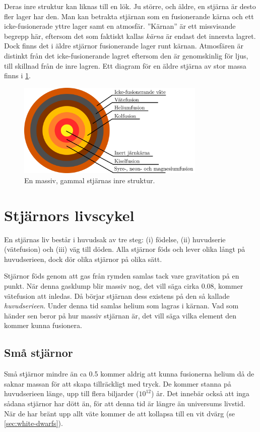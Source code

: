 Deras inre struktur kan liknas till en lök. Ju större, och äldre, en stjärna är desto fler lager har den. Man kan betrakta stjärnan som en fusionerande kärna och ett icke-fusionerade yttre lager samt en atmosfär. ''Kärnan'' är ett missvisande begrepp här, eftersom det som faktiskt kallas \emph{kärna} är endast det innersta lagret. Dock finns det i äldre stjärnor fusionerande lager runt kärnan. Atmosfären är distinkt från det icke-fusionerande lagret eftersom den är genomskinlig för ljus, till skillnad från de inre lagren. Ett diagram för en äldre stjärna av stor massa finns i \cref{fig:star-anatomy}.
\begin{figure}[h!]
    \centering
    \includegraphics[width=0.8\textwidth]{img/star.png}
    \caption{En massiv, gammal stjärnas inre struktur.}
    \label{fig:star-anatomy}
\end{figure}

\section{Stjärnors livscykel}
En stjärnas liv består i huvudsak av tre steg: (i) födelse, (ii) huvudserie (vätefusion) och (iii) väg till döden. Alla stjärnor föds och lever olika långt på huvudserieen, dock dör olika stjärnor på olika sätt.

Stjärnor föds genom att gas från rymden samlas tack vare gravitation på en punkt. När denna gasklump blir massiv nog, det vill säga cirka \qty{0.08}{\Mo}, kommer vätefusion att inledas. Då börjar stjärnan dess existens på den så kallade \emph{huvudserieen}. Under denna tid samlas helium som lagras i kärnan. Vad som händer sen beror på hur massiv stjärnan är, det vill säga vilka element den kommer kunna fusionera.

\subsection{Små stjärnor}
Små stjärnor mindre än ca \qty{0.5}{\Mo} kommer aldrig att kunna fusionerna helium då de saknar massan för att skapa tillräckligt med tryck. De kommer stanna på huvudserieen länge, upp till flera biljarder ($10^{12}$) år. Det innebär också att inga sådana stjärnor har dött än, för att denna tid är längre än universums livstid. När de har bränt upp allt väte kommer de att kollapsa till en vit dvärg (se \vref{sec:white-dwarfs}).

